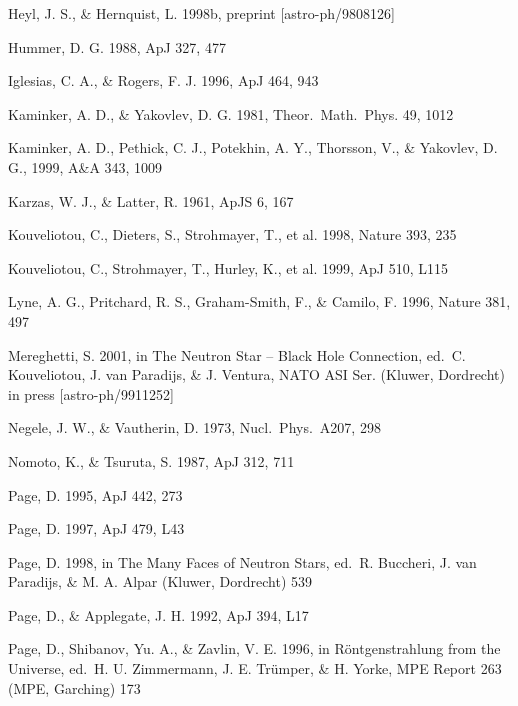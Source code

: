 \documentclass{aa}
\begin{document}
\begin{thebibliography}{}
Heyl, J. S., \& Hernquist, L. 1998b, preprint [astro-ph/9808126]

Hummer, D. G. 1988, ApJ 327, 477

Iglesias, C. A., \& Rogers, F. J. 1996,
ApJ 464, 943

Kaminker, A. D., \& Yakovlev, D. G. 1981,
Theor.\ Math.\ Phys. 49, 1012

Kaminker, A. D., Pethick, C. J., Potekhin, A. Y., Thorsson, V., \& Yakovlev, D. G.,
  1999, A\&A 343, 1009

Karzas, W. J., \& Latter, R. 1961,
ApJS 6, 167

Kouveliotou, C., Dieters, S., Strohmayer, T., et al. 1998, 
Nature 393, 235

Kouveliotou, C., Strohmayer, T., Hurley, K., et al. 1999, ApJ 510, L115

Lyne, A. G., Pritchard, R. S., Graham-Smith, F., \& Camilo, F. 1996,
Nature 381, 497%


Mereghetti, S. 2001,
in The Neutron Star -- Black Hole Connection,
ed.\ C. Kouveliotou, J. van Paradijs, \& J. Ventura,
NATO ASI Ser.
(Kluwer, Dordrecht) in press [astro-ph/9911252]

Negele, J. W., \& Vautherin, D. 1973, Nucl.\ Phys.\ A207, 298

Nomoto, K., \& Tsuruta, S. 1987,
ApJ 312, 711

Page, D. 1995, ApJ 442, 273

Page, D. 1997, ApJ 479, L43

Page, D. 1998, 
in 
The Many Faces of Neutron Stars, 
ed.\ R. Buccheri, J. van Paradijs, \& M. A. Alpar
(Kluwer, Dordrecht) 539

Page, D., \& Applegate, J. H. 1992, ApJ 394, L17

Page, D., Shibanov, Yu. A., \& Zavlin, V. E. 1996,
in R\"ontgenstrahlung from the Universe,
ed.\ H. U. Zimmermann, J. E. Tr\"umper, \& H. Yorke,
MPE Report 263 (MPE, Garching) 173 


\end{thebibliography}
\end{document}

